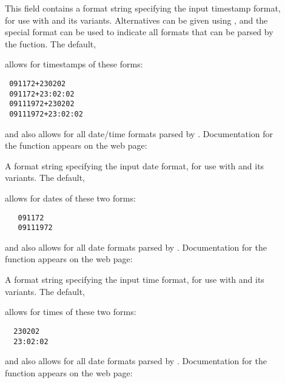 \begin{description}
\item[]
This field contains a format string specifying the input timestamp
format, for use with  and its variants.  Alternatives
can be given using \cd{\%|}, and the special \cd{\%\&} format can be
used to indicate all formats that can be parsed by the
 fuction.  The default,

%
\noindent
allows for timestamps of these forms:
\begin{verbatim}
 091172+230202
 091172+23:02:02
 09111972+230202
 09111972+23:02:02
\end{verbatim}
 and also allows for all date/time formats parsed by .
Documentation for the  function appears on the web page:
 
\item[]
 A format string specifying the input date format, for use with
  and its variants.  The default, 

%
\noindent
 allows for dates of these two forms:
\begin{verbatim}
   091172
   09111972
\end{verbatim}
and also allows for all date formats parsed by .
Documentation for the  function appears on the web page:

\item[]
 A format string specifying the input time format, for use with
  and its variants.  The default, 

%
\noindent
 allows for times of these two forms:
\begin{verbatim}
  230202
  23:02:02
\end{verbatim}
and also allows for all date formats parsed by .
Documentation for the  function appears on the web page:

\end{description}

